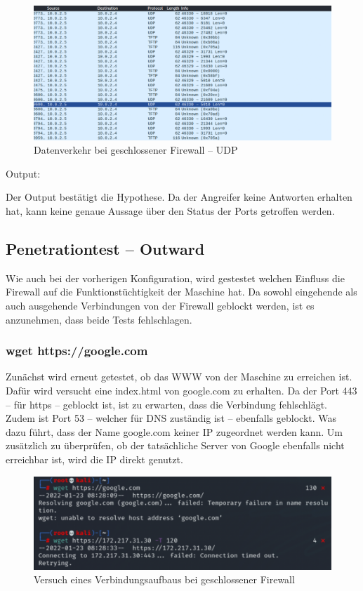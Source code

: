 \begin{figure}
	\includegraphics[width=\linewidth]{img/ws_firewall_closed_udp.png}
	\caption{Datenverkehr bei geschlossener Firewall – UDP}
	\label{fig:ws_firewall_closed_udp}
\end{figure}
Output:


Der Output bestätigt die Hypothese. Da der Angreifer keine Antworten erhalten hat, kann keine genaue Aussage über den Status der Ports getroffen werden. 

\subsection{Penetrationtest – Outward}
Wie auch bei der vorherigen Konfiguration, wird gestestet welchen Einfluss die Firewall auf die Funktionstüchtigkeit der Maschine hat. 
Da sowohl eingehende als auch ausgehende Verbindungen von der Firewall geblockt werden, ist es anzunehmen, dass beide Tests fehlschlagen.

\subsubsection*{wget https://google.com}
Zunächst wird erneut getestet, ob das WWW von der Maschine zu erreichen ist. Dafür wird versucht eine index.html von google.com zu erhalten. Da der Port 443 – für https – geblockt ist, ist zu erwarten, dass die Verbindung fehlschlägt. Zudem ist Port 53 – welcher für DNS zuständig ist – ebenfalls geblockt. Was dazu führt, dass der Name google.com keiner IP zugeordnet werden kann. Um zusätzlich zu überprüfen, ob der tatsächliche Server von Google ebenfalls nicht erreichbar ist, wird die IP direkt genutzt. 

\begin{figure}
	\includegraphics[width=\linewidth]{img/closed-in-out-output.png}
	\caption{Versuch eines Verbindungsaufbaus bei geschlossener Firewall}
	\label{fig:closed_in_out}
\end{figure}

